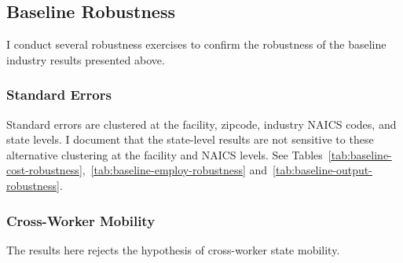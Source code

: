 \documentclass{C:/Users/david/OneDrive/Documents/ULMS/PhD/Thesis/chapter3/src/climate_change/latex/Economic_Journal/OUP-EJ}
\begin{document}
    \subsection{Baseline Robustness}\label{subsec:baseline-robustness}
    I conduct several robustness exercises to confirm the robustness of the baseline industry results presented above.

    \subsubsection{Standard Errors} Standard errors are clustered at the facility, zipcode, industry NAICS codes, and state levels. I document that the state-level results are not sensitive to these alternative clustering at the facility and NAICS levels. See Tables~\ref{tab:baseline-cost-robustness},~\ref{tab:baseline-employ-robustness} and~\ref{tab:baseline-output-robustness}.
    
    
    

    \subsubsection{Cross-Worker Mobility}\label{subsubsec:cross-worker-mobility}
    The results here rejects the hypothesis of cross-worker state mobility.
    
    
    
\end{document}
